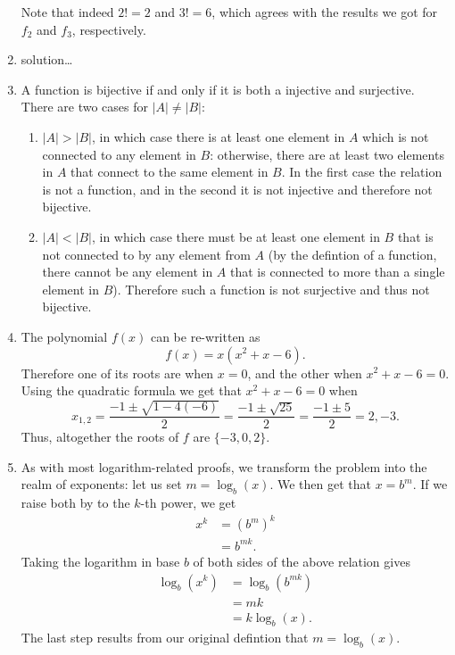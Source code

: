 \begin{enumerate}
	Note that indeed $2!=2$ and $3!=6$, which agrees with the results we got for $f_{2}$ and $f_{3}$, respectively.

	\item solution\ldots

	\item A function is bijective if and only if it is both a injective and surjective. There are two cases for $|A|\neq|B|$:
		\begin{enumerate}
			\item $|A|>|B|$, in which case there is at least one element in $A$ which is not connected to any element in $B$: otherwise, there are at least two elements in $A$ that connect to the same element in $B$. In the first case the relation is not a function, and in the second it is not injective and therefore not bijective.
			\item $|A|<|B|$, in which case there must be at least one element in $B$ that is not connected to by any element from $A$ (by the defintion of a function, there cannot be any element in $A$ that is connected to more than a single element in $B$). Therefore such a function is not surjective and thus not bijective.
		\end{enumerate}

	\item The polynomial $f(x)$ can be re-written as
		\[
			f(x) = x \left( x^{2}+x-6 \right).
		\]
		Therefore one of its roots are when $x=0$, and the other when $x^{2}+x-6=0$. Using the quadratic formula we get that $x^{2}+x-6=0$ when
		\[
			x_{1,2} = \frac{-1\pm\sqrt{1-4(-6)}}{2} = \frac{-1\pm\sqrt{25}}{2} = \frac{-1\pm5}{2} = 2,-3.
		\]
		Thus, altogether the roots of $f$ are $\{-3,0,2\}$.

	\item As with most logarithm-related proofs, we transform the problem into the realm of exponents: let us set $m=\log_{b}(x)$. We then get that $x=b^{m}$. If we raise both by to the $k$-th power, we get
		\begin{align*}
			x^{k} &= \left( b^{m} \right)^{k}\\
				  &= b^{mk}.
		\end{align*}
		Taking the logarithm in base $b$ of both sides of the above relation gives
		\begin{align*}
			\log_{b} \left( x^{k} \right) &= \log_{b} \left( b^{mk} \right)\\
										  &= mk\\
										  &= k\log_{b}(x).
		\end{align*}
		The last step results from our original defintion that $m=\log_{b}(x)$.


\end{enumerate}
